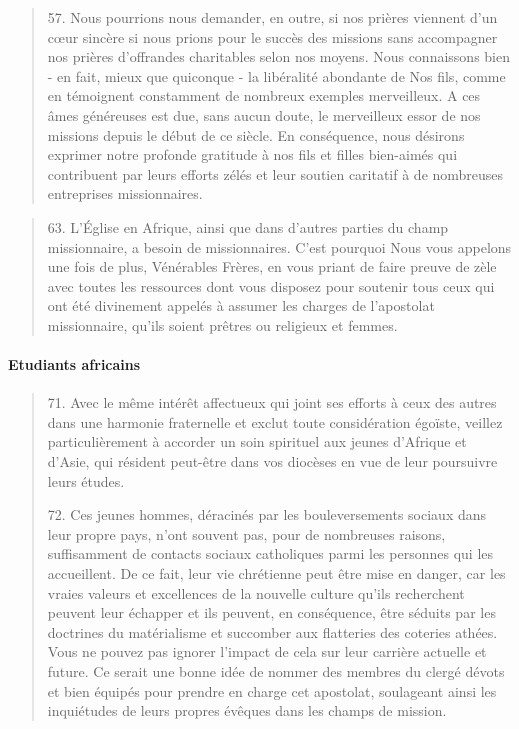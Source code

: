  \begin{quote}
     57. Nous pourrions nous demander, en outre, si nos prières viennent d'un cœur sincère si nous prions pour le succès des missions sans accompagner nos prières d'offrandes charitables selon nos moyens. Nous connaissons bien - en fait, mieux que quiconque - la libéralité abondante de Nos fils, comme en témoignent constamment de nombreux exemples merveilleux. A ces âmes généreuses est due, sans aucun doute, le merveilleux essor de nos missions depuis le début de ce siècle. En conséquence, nous désirons exprimer notre profonde gratitude à nos fils et filles bien-aimés qui contribuent par leurs efforts zélés et leur soutien caritatif à de nombreuses entreprises missionnaires.
 \end{quote}

 \begin{quote}
63. L'Église en Afrique, ainsi que dans d'autres parties du champ missionnaire, a besoin de missionnaires. C'est pourquoi Nous vous appelons une fois de plus, Vénérables Frères, en vous priant de faire preuve de zèle avec toutes les ressources dont vous disposez pour soutenir tous ceux qui ont été divinement appelés à assumer les charges de l'apostolat missionnaire, qu'ils soient prêtres ou religieux et femmes.
     
 \end{quote}

 \paragraph{Etudiants africains}
 \begin{quote}
     71. Avec le même intérêt affectueux qui joint ses efforts à ceux des autres dans une harmonie fraternelle et exclut toute considération égoïste, veillez particulièrement à accorder un soin spirituel aux jeunes d'Afrique et d'Asie, qui résident peut-être dans vos diocèses en vue de leur poursuivre leurs études.

72. Ces jeunes hommes, déracinés par les bouleversements sociaux dans leur propre pays, n'ont souvent pas, pour de nombreuses raisons, suffisamment de contacts sociaux catholiques parmi les personnes qui les accueillent. De ce fait, leur vie chrétienne peut être mise en danger, car les vraies valeurs et excellences de la nouvelle culture qu'ils recherchent peuvent leur échapper et ils peuvent, en conséquence, être séduits par les doctrines du matérialisme et succomber aux flatteries des coteries athées. Vous ne pouvez pas ignorer l'impact de cela sur leur carrière actuelle et future. Ce serait une bonne idée de nommer des membres du clergé dévots et bien équipés pour prendre en charge cet apostolat, soulageant ainsi les inquiétudes de leurs propres évêques dans les champs de mission.
 \end{quote}

